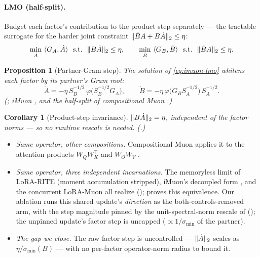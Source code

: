 \documentclass[11pt]{article}
\DeclarePairedDelimiter{\norm}{\lVert}{\rVert}
\newcommand{\polar}{\varphi}                 %
\theoremstyle{plain}
\newtheorem{proposition}{Proposition}
\newtheorem{corollary}{Corollary}
\theoremstyle{definition}
\theoremstyle{remark}
\begin{document}
\paragraph{LMO (half-split).} Budget each factor's contribution to the product step separately --- the tractable surrogate \cite{tilde_csd} for the harder joint constraint $\norm{\dot B A+B\dot A}_2\le\eta$:
\begin{equation}
  \min_{\dot A}\ \langle G_A,\dot A\rangle \ \ \text{s.t.}\ \ \norm{B\dot A}_2\le\eta,
  \qquad
  \min_{\dot B}\ \langle G_B,\dot B\rangle \ \ \text{s.t.}\ \ \norm{\dot B A}_2\le\eta .
  \label{eq:imuon-lmo}
\end{equation}
\begin{proposition}[Partner-Gram step]\label{prop:imuon}
The solution of \eqref{eq:imuon-lmo} whitens each factor by its partner's Gram root:
\begin{equation*}
  \dot A=-\eta\,S_B^{-1/2}\,\polar\!\big(S_B^{-1/2}G_A\big),\qquad
  \dot B=-\eta\,\polar\!\big(G_B S_A^{-1/2}\big)\,S_A^{-1/2}.
\end{equation*}
\emph{(; iMuon \cite{imuon}, and the half-split of compositional Muon \cite{tilde_csd}.)}
\end{proposition}
\begin{corollary}[Product-step invariance]\label{cor:imuon}
$\norm{B\dot A}_2=\eta$, independent of the factor norms --- so no runtime rescale is needed. \emph{(.)}
\end{corollary}
\begin{itemize}[leftmargin=1.5em,itemsep=1pt,topsep=2pt]
  \item \emph{Same operator, other compositions.} Compositional Muon applies it to the attention products $W_QW_K^\top$ and $W_OW_V$ \cite{tilde_csd}.
  \item \emph{Same operator, three independent incarnations.} The memoryless limit of LoRA-RITE \cite{lorarite} (moment accumulation stripped), iMuon's decoupled form \cite{imuon}, and the concurrent LoRA-Muon \cite{loramuon} all realize  (); \cite{loramuon} proves this equivalence. Our ablation runs this shared update's \emph{direction} as the both-controls-removed arm, with the step magnitude pinned by the unit-spectral-norm rescale of  (); the unpinned update's factor step is uncapped ($\propto1/\sigma_{\min}$ of the partner).
  \item \emph{The gap we close.} The raw factor step is uncontrolled --- $\norm{\dot A}_2$ scales as $\eta/\sigma_{\min}(B)$ --- with no per-factor operator-norm radius to bound it.
\end{itemize}
\end{document}
